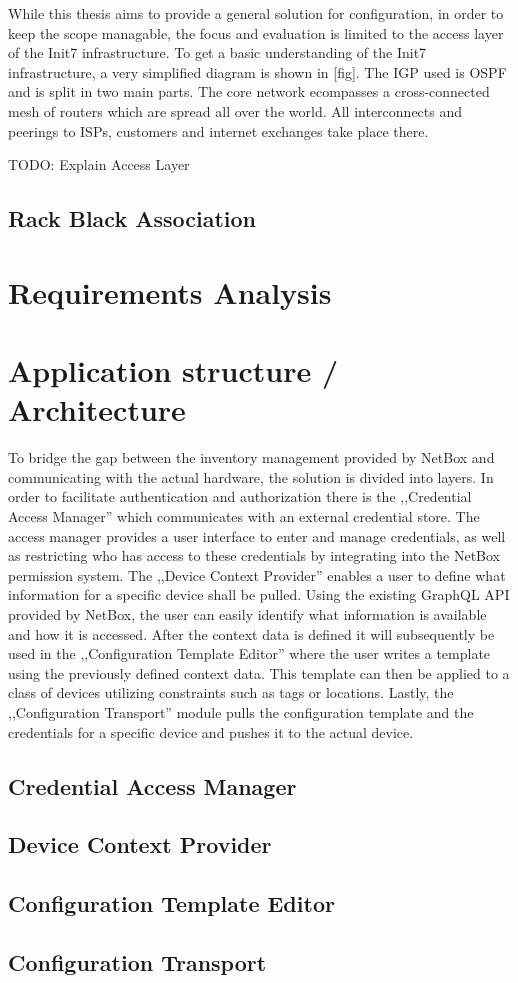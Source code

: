 While this thesis aims to provide a general solution for configuration, in order to keep the scope managable, the focus
and evaluation is limited to the access layer of the Init7 infrastructure.
To get a basic understanding of the Init7 infrastructure, a very simplified diagram is shown in [fig]. The \acrfull{IGP} used is
\acrshort{OSPF} and is split in two main parts. The core network ecompasses a cross-connected mesh of routers which are spread all
over the world. All interconnects and peerings to ISPs, customers and internet exchanges take place there. 

TODO: Explain Access Layer

\subsection{Rack Black Association}



\section{Requirements Analysis}

\section{Application structure / Architecture}

To bridge the gap between the inventory management provided by NetBox and communicating with the actual hardware,
the solution is divided into layers.
In order to facilitate authentication and authorization there is the ,,Credential Access Manager'' which communicates
with an external credential store. The access manager provides a user interface to enter and manage credentials, as well
as restricting who has access to these credentials by integrating into the NetBox permission system.
The ,,Device Context Provider'' enables a user to define what information for a specific device shall be pulled.
Using the existing GraphQL API provided by NetBox, the user can easily identify what information is available and how it is
accessed. After the context data is defined it will subsequently be used in the ,,Configuration Template Editor''
where the user writes a template using the previously defined context data. This template can then be applied to
a class of devices utilizing constraints such as tags or locations.
Lastly, the ,,Configuration Transport'' module pulls the configuration template and the credentials for a specific device
and pushes it to the actual device.

\subsection{Credential Access Manager}



\subsection{Device Context Provider}

\subsection{Configuration Template Editor}

\subsection{Configuration Transport}

